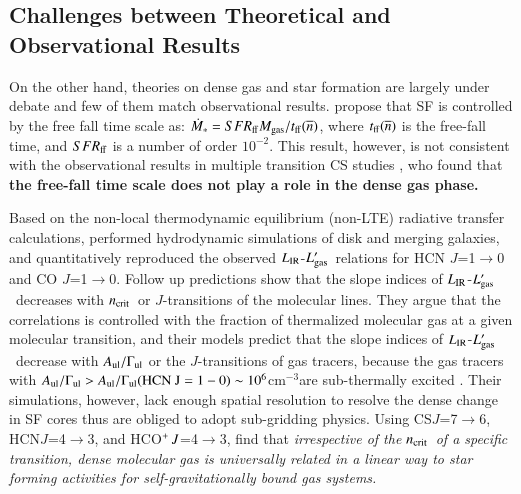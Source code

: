 \documentclass[legal,11pt]{article}
\newcommand{\nbar}{\overline{n}}
\def\cmt   {cm$^{-3}$\,}
\def\,{\thinspace}
\def\to{$\rightarrow$}
\def\ncrit{$n_{\rm crit}$}
\def\LIR     {$L_{\rm IR}$}
\def\LCO     {$L_{\rm CO}$}
\def\Lgas    {$L'_{\rm gas}$}
\def\HCNft        {HCN\,$J$=4$\rightarrow$3}
\def\HCOPft     {HCO$^+\,J$=4$\rightarrow$3}
\def\CSss          {CS\,$J$=7$\rightarrow$6}
\begin{document}


\subsection{Challenges between Theoretical and Observational Results}



On the other hand, theories on dense gas and star formation are largely under
debate and few of them match observational results.  \citet{kt07} propose that
SF is controlled by the free fall time scale as: $\dot{M}_* = SFR_{\rm ff}
M_{\rm gas} / t_{\rm ff}(\nbar)$, where $t_{\rm ff}(\nbar)$ is the free-fall
time, and $SFR_{\rm ff}$ is a number of order $10^{-2}$.  This result, however,
is not consistent with the observational results in multiple transition CS
studies \citep[i.e.,][]{zgh2014}, who found that {\bf the free-fall time scale does
not play a role in the dense gas phase.}


Based on the non-local thermodynamic equilibrium (non-LTE) radiative transfer
calculations, \citet{ncs08} performed hydrodynamic simulations of disk and
merging galaxies, and quantitatively reproduced the observed \LIR-\Lgas\
relations for HCN $J$=1\to0 and CO $J$=1\to0. Follow up predictions show that
the slope indices of \LIR-\Lgas\ decreases with \ncrit\ or $J$-transitions of
the molecular lines. They argue that the correlations is controlled with the
fraction of thermalized molecular gas at a given molecular transition, and
their models predict that the slope indices of \LIR-\Lgas\ decrease with
$A_{\rm ul}/\Gamma_{\rm ul}$ or the $J$-transitions of gas tracers, because the
gas tracers with $A_{\rm ul}/\Gamma_{\rm ul}> A_{\rm ul}/\Gamma_{\rm ul} (\rm
HCN\ J=1-0) \sim 10^6$\cmt are sub-thermally excited \citep[e.g.,][]{kt07, ncs08,
jnm09}. Their simulations, however, lack enough spatial resolution to resolve
the dense change in SF cores thus are obliged to adopt sub-gridding physics.
Using \CSss, \HCNft, and \HCOPft, \cite{zgh2014} find that {\it irrespective
of the \ncrit\ of a specific transition, dense molecular gas is universally
related in a linear way to star forming activities for self-gravitationally
bound gas systems.}
\end{document}
